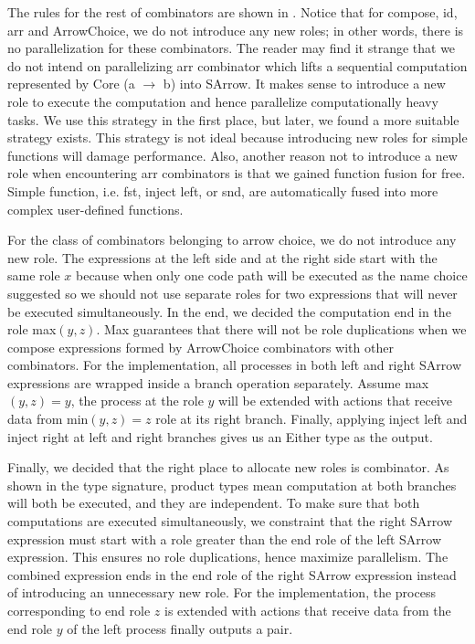 The rules for the rest of combinators are shown in . Notice that for compose, id, arr and ArrowChoice, we do not introduce any new roles; in other words, there is no parallelization for these combinators. The reader may find it strange that we do not intend on parallelizing arr combinator which lifts a sequential computation represented by Core (a $\rightarrow$ b) into SArrow. It makes sense to introduce a new role to execute the computation and hence parallelize computationally heavy tasks. We use this strategy in the first place, but later, we found a more suitable strategy exists. This strategy is not ideal because introducing new roles for simple functions will damage performance. Also, another reason not to introduce a new role when encountering arr combinators is that we gained function fusion for free. Simple function, i.e. fst, inject left, or snd, are automatically fused into more complex user-defined functions.  %

For the class of combinators belonging to arrow choice, we do not introduce any new role. The expressions at the left side and at the right side start with the same role $x$ because when only one code path will be executed as the name choice suggested so we should not use separate roles for two expressions that will never be executed simultaneously. In the end, we decided the computation end in the role max$(y,z)$. Max guarantees that there will not be role duplications when we compose expressions formed by ArrowChoice combinators with other combinators. For the implementation, all processes in both left and right SArrow expressions are wrapped inside a branch operation separately. Assume max$(y, z) = y$, the process at the role $y$ will be extended with actions that receive data from min$(y, z) = z$ role at its right branch. Finally, applying inject left and inject right at left and right branches gives us an Either type as the output.

Finally, we decided that the right place to allocate new roles is \hask{&&&} combinator. As shown in the type signature, product types mean computation at both branches will both be executed, and they are independent. To make sure that both computations are executed simultaneously, we constraint that the right SArrow expression must start with a role greater than the end role of the left SArrow expression. This ensures no role duplications, hence maximize parallelism. The combined expression ends in the end role of the right SArrow expression instead of introducing an unnecessary new role. For the implementation, the process corresponding to end role $z$ is extended with actions that receive data from the end role $y$ of the left process finally outputs a pair.

